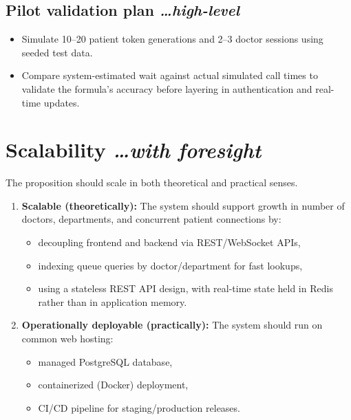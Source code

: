 \documentclass[11pt,a4paper]{article}
\newcommand{\BvrHint}[1]{%
  {\normalfont\normalsize\itshape\hfill #1}}
\begin{document}
\subsection{Pilot validation plan %
\BvrHint{\ldots high-level}}
\begin{itemize}[leftmargin=0.7cm]
    \item Simulate 10--20 patient token generations and 2--3 doctor sessions using seeded test data.
    \item Compare system-estimated wait against actual simulated call times to validate the formula's accuracy before layering in authentication and real-time updates.
\end{itemize}

\section{Scalability %
\BvrHint{\ldots with foresight}}
The proposition should scale in both theoretical and practical senses.

\begin{enumerate}[leftmargin=0.7cm]
    \item \textbf{Scalable (theoretically):} The system should support growth in number of doctors, departments, and concurrent patient connections by:
    \begin{itemize}[leftmargin=0.7cm]
        \item decoupling frontend and backend via REST/WebSocket APIs,
        \item indexing queue queries by doctor/department for fast lookups,
        \item using a stateless REST API design, with real-time state held in Redis rather than in application memory.
    \end{itemize}
    
    \item \textbf{Operationally deployable (practically):} The system should run on common web hosting:
    \begin{itemize}[leftmargin=0.7cm]
        \item managed PostgreSQL database,
        \item containerized (Docker) deployment,
        \item CI/CD pipeline for staging/production releases.
    \end{itemize}
\end{enumerate}
\end{document}
